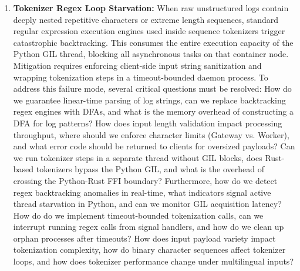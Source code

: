 \documentclass[11pt,a4paper]{article}
\theoremstyle{plain}
\theoremstyle{definition}
\theoremstyle{remark}
\begin{document}
\begin{enumerate}[label=\textbf{DF\arabic*.}]
    \item \textbf{Tokenizer Regex Loop Starvation:} 
    When raw unstructured logs contain deeply nested repetitive characters or extreme length sequences, standard regular expression execution engines used inside sequence tokenizers trigger catastrophic backtracking. This consumes the entire execution capacity of the Python GIL thread, blocking all asynchronous tasks on that container node. 
    Mitigation requires enforcing client-side input string sanitization and wrapping tokenization steps in a timeout-bounded daemon process.
    To address this failure mode, several critical questions must be resolved: How do we guarantee linear-time parsing of log strings, can we replace backtracking regex engines with DFAs, and what is the memory overhead of constructing a DFA for log patterns? How does input length validation impact processing throughput, where should we enforce character limits (Gateway vs. Worker), and what error code should be returned to clients for oversized payloads? Can we run tokenizer steps in a separate thread without GIL blocks, does Rust-based tokenizers bypass the Python GIL, and what is the overhead of crossing the Python-Rust FFI boundary? Furthermore, how do we detect regex backtracking anomalies in real-time, what indicators signal active thread starvation in Python, and can we monitor GIL acquisition latency? How do do we implement timeout-bounded tokenization calls, can we interrupt running regex calls from signal handlers, and how do we clean up orphan processes after timeouts? How does input payload variety impact tokenization complexity, how do binary character sequences affect tokenizer loops, and how does tokenizer performance change under multilingual inputs?


\end{enumerate}
\end{document}
